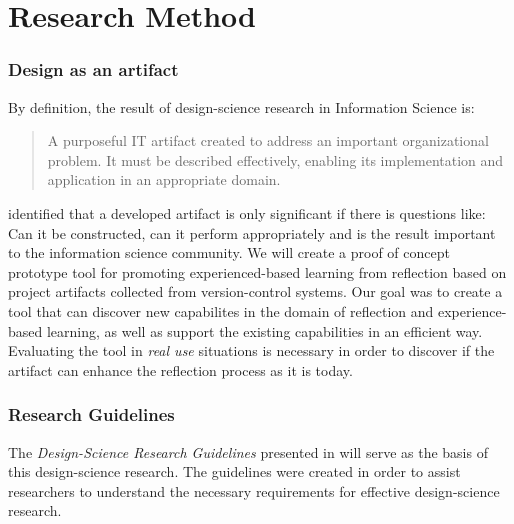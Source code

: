 %
%
\section{Research Method}


\subsubsection{Design as an artifact}
By definition, the result of design-science research in Information Science is:
\begin{quote}
A purposeful IT artifact created to address an important organizational problem. It must be described effectively, enabling its implementation and application in an appropriate domain.
\end{quote}
\cite{markusetal} identified that a developed artifact is only significant if there is questions like: Can it be constructed, can it perform appropriately and is the result important to the information science community. 
We will create a proof of concept prototype tool for promoting experienced-based learning from reflection based on project artifacts collected from version-control systems. Our goal was to create a tool that can discover new capabilites in the domain of reflection and experience-based learning, as well as support the existing capabilities in an efficient way. Evaluating the tool in \emph{real use} situations is necessary in order to discover if the artifact can enhance the reflection process as it is today. \\

\subsubsection{Research Guidelines}
The \emph{Design-Science Research Guidelines} presented in \cite{Esearch2004} will serve as the basis of this design-science research. The guidelines were created in order to assist researchers to understand the necessary requirements for effective design-science research. 

